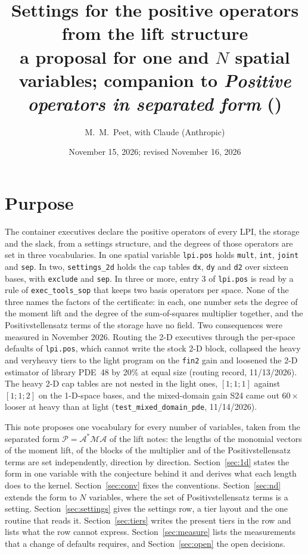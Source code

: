 \documentclass[12pt]{article}
\title{Settings for the positive operators from the lift structure \\
\large a proposal for one and $N$ spatial variables; companion to
\emph{Positive operators in separated form} (\file{sopvar_lift_notes})}
\author{M.~M.~Peet, with Claude (Anthropic)}
\date{November 15, 2026; revised November 16, 2026}
\newcommand{\mcl}[1]{\mathcal{#1}}
\newcommand{\code}[1]{\texttt{#1}}
\theoremstyle{plain}
\theoremstyle{definition}
\theoremstyle{remark}
\begin{document}
\maketitle

\section{Purpose}

The container executives declare the positive operators of every LPI, the storage and the slack, from a settings structure, and the degrees of those operators are set in three vocabularies. In one spatial variable \code{lpi.pos} holds \code{mult}, \code{int}, \code{joint} and \code{sep}. In two, \code{settings\_2d} holds the cap tables \code{dx}, \code{dy} and \code{d2} over sixteen bases, with \code{exclude} and \code{sep}. In three or more, entry 3 of \code{lpi.pos} is read by a rule of \code{exec\_tools\_sop} that keeps two basis operators per space. None of the three names the factors of the certificate: in each, one number sets the degree of the moment lift and the degree of the sum-of-squares multiplier together, and the Positivstellensatz terms of the storage have no field. Two consequences were measured in November 2026. Routing the 2-D executives through the per-space defaults of \code{lpi.pos}, which cannot write the stock 2-D block, collapsed the heavy and veryheavy tiers to the light program on the \code{fin2} gain and loosened the 2-D estimator of library PDE~48 by 20\% at equal size (routing record, 11/13/2026). The heavy 2-D cap tables are not nested in the light ones, $[1;1;1]$ against $[1;1;2]$ on the 1-D-space bases, and the mixed-domain gain S24 came out $60\times$ looser at heavy than at light (\code{test\_mixed\_domain\_pde}, 11/14/2026).

This note proposes one vocabulary for every number of variables, taken from the separated form $\mcl P=\mcl A^*\mcl M\mcl A$ of the lift notes: the lengths of the monomial vectors of the moment lift, of the blocks of the multiplier and of the Positivstellensatz terms are set independently, direction by direction. Section~\ref{sec:1d} states the form in one variable with the conjecture behind it and derives what each length does to the kernel. Section~\ref{sec:conv} fixes the conventions. Section~\ref{sec:nd} extends the form to $N$ variables, where the set of Positivstellensatz terms is a setting. Section~\ref{sec:settings} gives the settings row, a tier layout and the one routine that reads it. Section~\ref{sec:tiers} writes the present tiers in the row and lists what the row cannot express. Section~\ref{sec:measure} lists the measurements that a change of defaults requires, and Section~\ref{sec:open} the open decisions.
\end{document}
